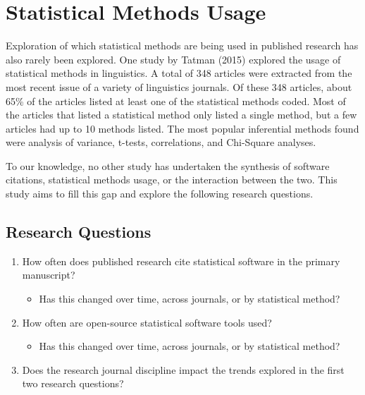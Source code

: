 \documentclass[
  english,
  ,man]{apa7}
\providecommand{\tightlist}{%
  \setlength{\itemsep}{0pt}\setlength{\parskip}{0pt}}
\begin{document}
\hypertarget{statistical-methods-usage}{%
\section{Statistical Methods Usage}\label{statistical-methods-usage}}

Exploration of which statistical methods are being used in published research has also rarely been explored. One study by Tatman (2015) explored the usage of statistical methods in linguistics. A total of 348 articles were extracted from the most recent issue of a variety of linguistics journals. Of these 348 articles, about 65\% of the articles listed at least one of the statistical methods coded. Most of the articles that listed a statistical method only listed a single method, but a few articles had up to 10 methods listed. The most popular inferential methods found were analysis of variance, t-tests, correlations, and Chi-Square analyses.

To our knowledge, no other study has undertaken the synthesis of software citations, statistical methods usage, or the interaction between the two. This study aims to fill this gap and explore the following research questions.

\hypertarget{research-questions}{%
\subsection{Research Questions}\label{research-questions}}

\begin{enumerate}
\def\labelenumi{\arabic{enumi}.}
\tightlist
\item
  How often does published research cite statistical software in the primary manuscript?

  \begin{itemize}
  \tightlist
  \item
    Has this changed over time, across journals, or by statistical method?
  \end{itemize}
\item
  How often are open-source statistical software tools used?

  \begin{itemize}
  \tightlist
  \item
    Has this changed over time, across journals, or by statistical method?
  \end{itemize}
\item
  Does the research journal discipline impact the trends explored in the first two research questions?
\end{enumerate}
\end{document}

